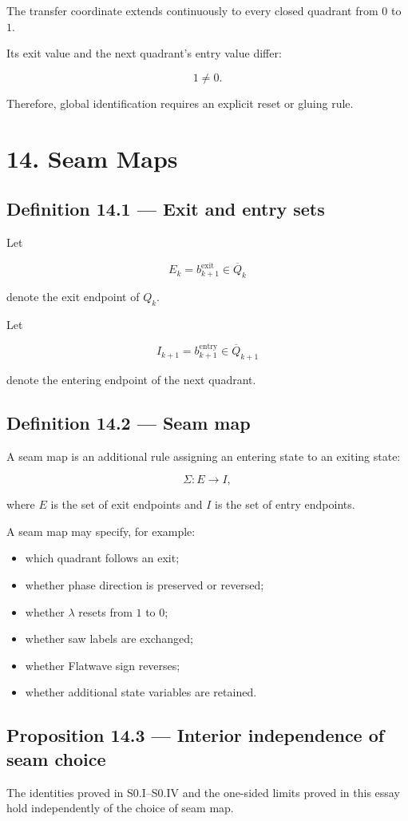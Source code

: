 \documentclass[11pt,oneside,openany]{book}
\newcommand{\PCsection}[1]{%
  \section*{#1}\addcontentsline{toc}{section}{#1}%
}
\newcommand{\PCsubsection}[1]{%
  \subsection*{#1}%
}
\begin{document}
The transfer coordinate extends continuously to every closed quadrant from \(0\) to \(1\).

Its exit value and the next quadrant's entry value differ:

\[
1\neq0.
\]

Therefore, global identification requires an explicit reset or gluing rule.


\PCsection{14. Seam Maps}

\PCsubsection{Definition 14.1 --- Exit and entry sets}

Let

\[
E_k = b_{k+1}^{\mathrm{exit}} \in\overline Q_k
\]

denote the exit endpoint of \(Q_k\).

Let

\[
I_{k+1} = b_{k+1}^{\mathrm{entry}} \in\overline Q_{k+1}
\]

denote the entering endpoint of the next quadrant.

\PCsubsection{Definition 14.2 --- Seam map}

A seam map is an additional rule assigning an entering state to an exiting state:

\[
\Sigma:E\to I,
\]

where \(E\) is the set of exit endpoints and \(I\) is the set of entry endpoints.

A seam map may specify, for example:

\begin{itemize}
\item which quadrant follows an exit;
\item whether phase direction is preserved or reversed;
\item whether \(\lambda\) resets from \(1\) to \(0\);
\item whether saw labels are exchanged;
\item whether Flatwave sign reverses;
\item whether additional state variables are retained.
\end{itemize}
\PCsubsection{Proposition 14.3 --- Interior independence of seam choice}

The identities proved in S0.I–S0.IV and the one-sided limits proved in this essay hold independently of the choice of seam map.
\end{document}
